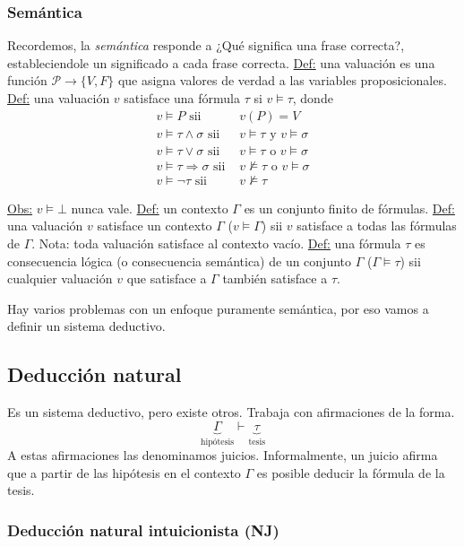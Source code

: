 \documentclass[12pt]{extarticle}
\def\definicion{\newline\underline{Def:} }
\def\observacion{\underline{Obs:} }
\begin{document}
\subsubsection{Semántica}
Recordemos, la \textit{semántica} responde a ¿Qué significa una frase correcta?, estableciendole un significado a cada frase correcta.
\definicion una valuación es una función $\mathcal{P} \rightarrow \{V,F\}$ que asigna valores de verdad a las variables proposicionales.
\definicion una valuación $v$ satisface una fórmula $\tau$ si $v \models \tau$, donde
\begin{align*}
  v \models P \text{ sii }& v(P) = V \\
  v \models \tau \land \sigma \text{ sii }& v \models \tau \text { y } v \models \sigma \\
  v \models \tau \lor \sigma \text{ sii }& v \models \tau \text{ o } v \models \sigma \\
  v \models \tau \Rightarrow \sigma \text{ sii }& v \not\models \tau \text{ o } v \models \sigma \\
  v \models \neg \tau \text{ sii }& v \not\models \tau
\end{align*}

\observacion $v \models \bot$ nunca vale.
\definicion un contexto $\Gamma$ es un conjunto finito de fórmulas.
\definicion una valuación $v$ satisface un contexto $\Gamma$ ($v \models \Gamma$) sii $v$ satisface a todas las fórmulas de $\Gamma$. Nota: toda valuación satisface al contexto vacío.
\definicion una fórmula $\tau$ es consecuencia lógica (o consecuencia semántica) de un conjunto $\Gamma$ ($\Gamma \models \tau$) sii cualquier valuación $v$ que satisface a $\Gamma$ también satisface a $\tau$.

Hay varios problemas con un enfoque puramente semántica, por eso vamos a definir un sistema deductivo.

\subsection{Deducción natural}
Es un sistema deductivo, pero existe otros. Trabaja con afirmaciones de la forma.
{\Large $$\underbrace{\Gamma}_{\text{hipótesis}} \vdash \underbrace{\tau}_{\text{tesis}}$$ }
A estas afirmaciones las denominamos juicios. Informalmente, un juicio afirma que a partir de las hipótesis en el contexto $\Gamma$ es posible deducir la fórmula de la tesis.

\subsubsection{Deducción natural intuicionista (NJ)}
\end{document}
